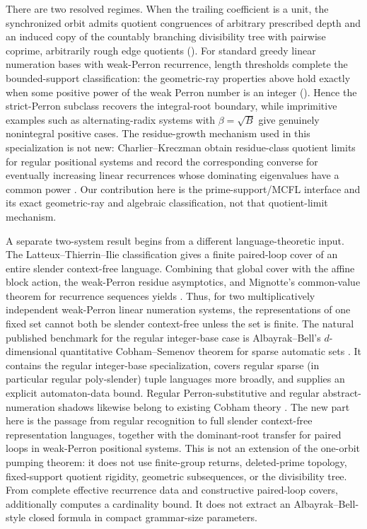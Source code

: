 There are two resolved regimes. When the trailing coefficient is a unit,
the synchronized orbit admits quotient congruences of arbitrary prescribed
depth and an induced copy of the countably branching divisibility tree with
pairwise coprime, arbitrarily rough edge quotients
().
For standard greedy linear numeration bases with weak-Perron recurrence,
length thresholds complete the bounded-support classification: the
geometric-ray properties above hold exactly when some positive power of the
weak Perron number is an integer
(). Hence the
strict-Perron subclass recovers the integral-root boundary, while
imprimitive examples such as alternating-radix systems with
\(\beta=\sqrt B\) give genuinely nonintegral positive cases. The
residue-growth mechanism used in this specialization is not new:
Charlier--Kreczman obtain residue-class quotient limits for regular
positional systems and record the corresponding converse for eventually
increasing linear recurrences whose dominating eigenvalues have a common
power \cite[Proposition~10 and Remark~12]{CharlierKreczman2025}. Our
contribution here is the prime-support/MCFL interface and its exact
geometric-ray and algebraic classification, not that quotient-limit
mechanism.

A separate two-system result begins from a different language-theoretic
input. The Latteux--Thierrin--Ilie classification gives a finite paired-loop
cover of an entire slender context-free language. Combining that global
cover with the affine block action, the weak-Perron residue asymptotics, and
Mignotte's common-value theorem for recurrence sequences yields
. Thus, for two multiplicatively independent
weak-Perron linear numeration systems, the representations of one fixed set
cannot both be slender context-free unless the set is finite. The natural
published benchmark for the regular integer-base case is Albayrak--Bell's
\(d\)-dimensional quantitative Cobham--Semenov theorem for sparse automatic
sets \cite[Theorems~1.1 and 4.1]{AlbayrakBell2023}. It contains the regular
integer-base specialization, covers regular sparse (in particular regular
poly-slender) tuple languages more broadly, and supplies an explicit
automaton-data bound. Regular Perron-substitutive and regular abstract-
numeration shadows likewise belong to existing Cobham theory
\cite[Theorem~1]{Durand2011CobhamSubstitutions}%
\cite[Theorem~49]{CharlierLeroyRigo2013CobhamANS}. The new part here is the
passage from regular recognition to full slender context-free representation
languages, together with the dominant-root transfer for paired loops in
weak-Perron positional systems. This is not an extension of the one-orbit
pumping theorem: it does not use finite-group returns, deleted-prime
topology, fixed-support quotient rigidity, geometric subsequences, or the
divisibility tree. From complete effective recurrence data and constructive
paired-loop covers,  additionally
computes a cardinality bound. It does not extract an Albayrak--Bell-style
closed formula in compact grammar-size parameters.

